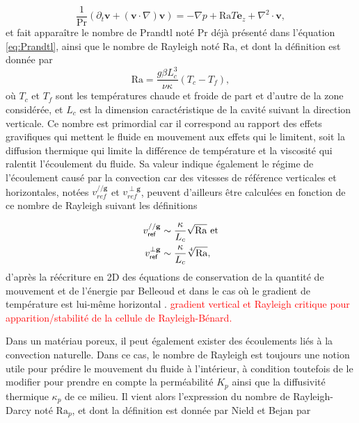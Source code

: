 \begin{equation}
	\frac{1}{\mathrm{Pr}}(\partial_t \mathbf{v} + (\mathbf{v} \cdot \nabla)\mathbf{v}) = -\nabla p + \mathrm{Ra} T \mathbf e_z + \nabla^2 \cdot \mathbf{v},
	\label{eq:NonDim_NavierStokes_Boussinesq_QtMvt}
\end{equation}
et fait apparaître le nombre de Prandtl noté $\mathrm{Pr}$ déjà présenté dans l'équation \eqref{eq:Prandtl}, ainsi que le nombre de Rayleigh noté $\mathrm{Ra}$, et dont la définition est donnée par 
\begin{equation}
	\mathrm{Ra} = \frac{g \beta L_c^3}{\nu \kappa} (T_c-T_f),
	\label{eq:NbrRayleigh}
\end{equation}
où $T_c$ et $T_f$ sont les températures chaude et froide de part et d'autre de la zone considérée, et $L_c$ est la dimension caractéristique de la cavité suivant la direction verticale. Ce nombre est primordial car il correspond au rapport des effets gravifiques qui mettent le fluide en mouvement aux effets qui le limitent, soit la diffusion thermique qui limite la différence de température et la viscosité qui ralentit l'écoulement du fluide. Sa valeur indique également le régime de l'écoulement causé par la convection car des vitesses de référence verticales et horizontales, notées $v_{ref}^{// \mathbf g}$ et $v_{ref}^{\perp \mathbf g}$, peuvent d'ailleurs être calculées en fonction de ce nombre de Rayleigh suivant les définitions

\begin{subequations}
	\begin{align}
		v_{\sf ref}^{// \mathbf g} &\sim \frac{\kappa}{L_c}\sqrt{\mathrm{Ra}} \text{ et}	\label{eq:VitesseReferenceV_Rayleigh}\\
		v_{\sf ref}^{\perp \mathbf g} &\sim \frac{\kappa}{L_c}\sqrt[4]{\mathrm{Ra}},	\label{eq:VitesseReferenceH_Rayleigh}
	\end{align}
	\label{eq:VitesseReference_Rayleigh}%
\end{subequations}
d'après la réécriture en 2D des équations de conservation de la quantité de mouvement et de l'énergie par Belleoud et dans le cas où le gradient de température est lui-même horizontal \cite{belleoud_etude_2016}. \textcolor{red}{gradient vertical et Rayleigh critique pour apparition/stabilité de la cellule de Rayleigh-Bénard.}

Dans un matériau poreux, il peut également exister des écoulements liés à la convection naturelle. Dans ce cas, le nombre de Rayleigh est toujours une notion utile pour prédire le mouvement du fluide à l'intérieur, à condition toutefois de le modifier pour prendre en compte la perméabilité $K_p$ ainsi que la diffusivité thermique $\kappa_p$ de ce milieu. Il vient alors l'expression du nombre de Rayleigh-Darcy noté $\mathrm{Ra}_p$, et dont la définition est donnée par Nield et Bejan \cite{nield_convection_2013} par

